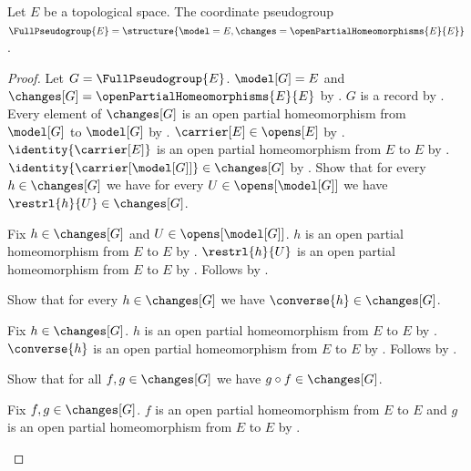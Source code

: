 \begin{construction}\label{full_pseudogroup}
    Let $E$ be a topological space.
    The coordinate pseudogroup $\FullPseudogroup{E}=
        \structure{\model=E,\changes=\openPartialHomeomorphisms{E}{E}}$.
\end{construction}
\begin{proof}
    Let $G=\FullPseudogroup{E}$.
    $\model[G]=E$ and $\changes[G]=\openPartialHomeomorphisms{E}{E}$ by
        .
    $G$ is a record by .
    Every element of $\changes[G]$ is an open partial homeomorphism from
        $\model[G]$ to $\model[G]$ by .
    $\carrier[E]\in\opens[E]$ by .
    $\identity{\carrier[E]}$ is an open partial homeomorphism from $E$ to $E$ by
        .
    $\identity{\carrier[\model[G]]}\in\changes[G]$ by
        .
    Show that for every $h\in\changes[G]$ we have for every $U\in\opens[\model[G]]$
        we have $\restrl{h}{U}\in\changes[G]$.
    \begin{subproof}
        Fix $h\in\changes[G]$ and $U\in\opens[\model[G]]$.
        $h$ is an open partial homeomorphism from $E$ to $E$ by
            .
        $\restrl{h}{U}$ is an open partial homeomorphism from $E$ to $E$ by
            .
        Follows by .
    \end{subproof}
    Show that for every $h\in\changes[G]$ we have $\converse{h}\in\changes[G]$.
    \begin{subproof}
        Fix $h\in\changes[G]$.
        $h$ is an open partial homeomorphism from $E$ to $E$ by
            .
        $\converse{h}$ is an open partial homeomorphism from $E$ to $E$ by
            .
        Follows by .
    \end{subproof}
    Show that for all $f,g\in\changes[G]$ we have $g\circ f\in\changes[G]$.
    \begin{subproof}
        Fix $f,g\in\changes[G]$.
        $f$ is an open partial homeomorphism from $E$ to $E$ and
            $g$ is an open partial homeomorphism from $E$ to $E$ by
            .

\end{subproof}
\end{proof}
